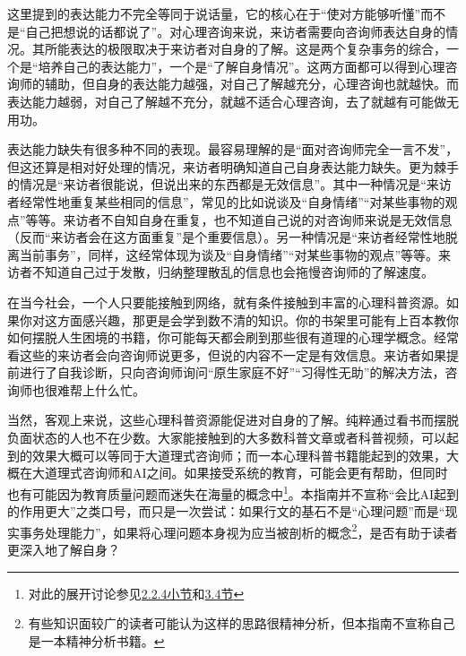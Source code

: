 这里提到的表达能力不完全等同于说话量，它的核心在于“使对方能够听懂”而不是“自己把想说的话都说了”。对心理咨询来说，来访者需要向咨询师表达自身的情况。其所能表达的极限取决于来访者对自身的了解。这是两个复杂事务的综合，一个是“培养自己的表达能力”，一个是“了解自身情况”。这两方面都可以得到心理咨询师的辅助，但自身的表达能力越强，对自己了解越充分，心理咨询也就越快。而表达能力越弱，对自己了解越不充分，就越不适合心理咨询，去了就越有可能做无用功。
\begin{examples}
表达能力缺失有很多种不同的表现。最容易理解的是“面对咨询师完全一言不发”，但这还算是相对好处理的情况，来访者明确知道自己自身表达能力缺失。更为棘手的情况是“来访者很能说，但说出来的东西都是无效信息”。其中一种情况是“来访者经常性地重复某些相同的信息”，常见的比如说谈及“自身情绪”“对某些事物的观点”等等。来访者不自知自身在重复，也不知道自己说的对咨询师来说是无效信息（反而“来访者会在这方面重复”是个重要信息）。另一种情况是“来访者经常性地脱离当前事务”，同样，这经常体现为谈及“自身情绪”“对某些事物的观点”等等。来访者不知道自己过于发散，归纳整理散乱的信息也会拖慢咨询师的了解速度。
\end{examples}
在当今社会，一个人只要能接触到网络，就有条件接触到丰富的心理科普资源。如果你对这方面感兴趣，那更是会学到数不清的知识。你的书架里可能有上百本教你如何摆脱人生困境的书籍，你可能每天都会刷到那些很有道理的心理学概念。经常看这些的来访者会向咨询师说更多，但说的内容不一定是有效信息。来访者如果提前进行了自我诊断，只向咨询师询问“原生家庭不好”“习得性无助”的解决方法，咨询师也很难帮上什么忙。

当然，客观上来说，这些心理科普资源能促进对自身的了解。纯粹通过看书而摆脱负面状态的人也不在少数。大家能接触到的大多数科普文章或者科普视频，可以起到的效果大概可以等同于大道理式咨询师；而一本心理科普书籍能起到的效果，大概在大道理式咨询师和AI之间。如果接受系统的教育，可能会更有帮助，但同时也有可能因为教育质量问题而迷失在海量的概念中\footnote{对此的展开讨论参见\hyperref[sec:污染]{2.2.4小节}和\hyperref[sec:人的意识演化基本模型]{3.4节}}。本指南并不宣称“会比AI起到的作用更大”之类口号，而只是一次尝试：如果行文的基石不是“心理问题”而是“现实事务处理能力”，如果将心理问题本身视为应当被剖析的概念\footnote{有些知识面较广的读者可能认为这样的思路很精神分析，但本指南不宣称自己是一本精神分析书籍。}，是否有助于读者更深入地了解自身？

